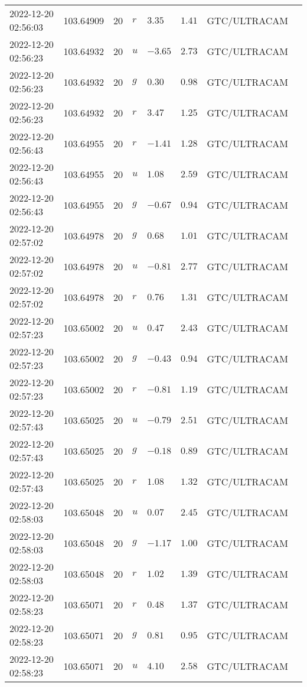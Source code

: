\documentclass{nature_plusfigure}
\begin{document}
\begin{supplement}
\begin{center}
\begin{longtable}{llllllll}
2022-12-20 02:56:03 & 103.64909 & 20 & $r$ & $3.35$ & $1.41$ & GTC/ULTRACAM &  \\ 
2022-12-20 02:56:23 & 103.64932 & 20 & $u$ & $-3.65$ & $2.73$ & GTC/ULTRACAM &  \\ 
2022-12-20 02:56:23 & 103.64932 & 20 & $g$ & $0.30$ & $0.98$ & GTC/ULTRACAM &  \\ 
2022-12-20 02:56:23 & 103.64932 & 20 & $r$ & $3.47$ & $1.25$ & GTC/ULTRACAM &  \\ 
2022-12-20 02:56:43 & 103.64955 & 20 & $r$ & $-1.41$ & $1.28$ & GTC/ULTRACAM &  \\ 
2022-12-20 02:56:43 & 103.64955 & 20 & $u$ & $1.08$ & $2.59$ & GTC/ULTRACAM &  \\ 
2022-12-20 02:56:43 & 103.64955 & 20 & $g$ & $-0.67$ & $0.94$ & GTC/ULTRACAM &  \\ 
2022-12-20 02:57:02 & 103.64978 & 20 & $g$ & $0.68$ & $1.01$ & GTC/ULTRACAM &  \\ 
2022-12-20 02:57:02 & 103.64978 & 20 & $u$ & $-0.81$ & $2.77$ & GTC/ULTRACAM &  \\ 
2022-12-20 02:57:02 & 103.64978 & 20 & $r$ & $0.76$ & $1.31$ & GTC/ULTRACAM &  \\ 
2022-12-20 02:57:23 & 103.65002 & 20 & $u$ & $0.47$ & $2.43$ & GTC/ULTRACAM &  \\ 
2022-12-20 02:57:23 & 103.65002 & 20 & $g$ & $-0.43$ & $0.94$ & GTC/ULTRACAM &  \\ 
2022-12-20 02:57:23 & 103.65002 & 20 & $r$ & $-0.81$ & $1.19$ & GTC/ULTRACAM &  \\ 
2022-12-20 02:57:43 & 103.65025 & 20 & $u$ & $-0.79$ & $2.51$ & GTC/ULTRACAM &  \\ 
2022-12-20 02:57:43 & 103.65025 & 20 & $g$ & $-0.18$ & $0.89$ & GTC/ULTRACAM &  \\ 
2022-12-20 02:57:43 & 103.65025 & 20 & $r$ & $1.08$ & $1.32$ & GTC/ULTRACAM &  \\ 
2022-12-20 02:58:03 & 103.65048 & 20 & $u$ & $0.07$ & $2.45$ & GTC/ULTRACAM &  \\ 
2022-12-20 02:58:03 & 103.65048 & 20 & $g$ & $-1.17$ & $1.00$ & GTC/ULTRACAM &  \\ 
2022-12-20 02:58:03 & 103.65048 & 20 & $r$ & $1.02$ & $1.39$ & GTC/ULTRACAM &  \\ 
2022-12-20 02:58:23 & 103.65071 & 20 & $r$ & $0.48$ & $1.37$ & GTC/ULTRACAM &  \\ 
2022-12-20 02:58:23 & 103.65071 & 20 & $g$ & $0.81$ & $0.95$ & GTC/ULTRACAM &  \\ 
2022-12-20 02:58:23 & 103.65071 & 20 & $u$ & $4.10$ & $2.58$ & GTC/ULTRACAM &  \\ 

\end{longtable}
\end{center}
\end{supplement}
\end{document}
